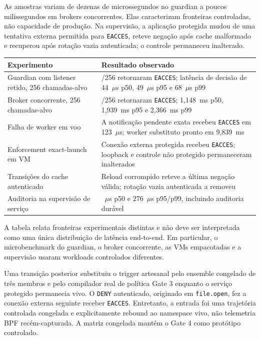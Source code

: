 \documentclass[11pt,a4paper]{article}
\begin{document}
As amostras variam de dezenas de microssegundos no guardian a poucos
milissegundos em brokers concorrentes. Elas caracterizam fronteiras controladas,
não capacidade de produção. Na supervisão, a aplicação protegida mudou de uma
tentativa externa permitida para \texttt{EACCES}, reteve negação após cache
malformado e recuperou após rotação vazia autenticada; o controle permaneceu
inalterado.

\begin{center}
\small
\begin{tabular}{>{\raggedright\arraybackslash}p{} >{\raggedright\arraybackslash}p{}}
\toprule
Experimento & Resultado observado \\
\midrule
Guardian com listener retido, 256 chamadas-alvo~\cite{guardian} & 256/256 retornaram \texttt{EACCES}; latência de decisão de 44~$\mu$s p50, 49~$\mu$s p95 e 68~$\mu$s p99 \\
Broker concorrente, 256 chamadas-alvo~\cite{concurrency} & 256/256 retornaram \texttt{EACCES}; 1,148~ms p50, 1,939~ms p95 e 2,366~ms p99 \\
Falha de worker em voo~\cite{inflight} & A notificação pendente exata recebeu \texttt{EACCES} em 123~$\mu$s; worker substituto pronto em 9,839~ms \\
Enforcement exact-launch em VM~\cite{exactlaunch} & Conexão externa protegida recebeu \texttt{EACCES}; loopback e controle não protegido permaneceram inalterados \\
Transições do cache autenticado & Reload corrompido reteve a última negação válida; rotação vazia autenticada a removeu \\
Auditoria na supervisão de serviço & 191~$\mu$s p50 e 276~$\mu$s p95/p99, incluindo auditoria durável \\
\bottomrule
\end{tabular}
\end{center}

A tabela relata fronteiras experimentais distintas e não deve ser interpretada
como uma única distribuição de latência end-to-end. Em particular, o
microbenchmark do guardian, o broker concorrente, as VMs empacotadas e a
supervisão usaram workloads controlados diferentes.

Uma transição posterior substituiu o trigger artesanal pelo ensemble congelado
de três membros e pelo compilador real de política Gate 3 enquanto o serviço
protegido permanecia vivo. O \texttt{DENY} autenticado, originado em
\texttt{file.open}, fez a conexão externa seguinte receber \texttt{EACCES}.
Entretanto, a entrada foi uma trajetória controlada congelada e explicitamente
rebound ao namespace vivo, não telemetria BPF recém-capturada. A matriz
congelada mantém o Gate 4 como protótipo controlado.
\end{document}
